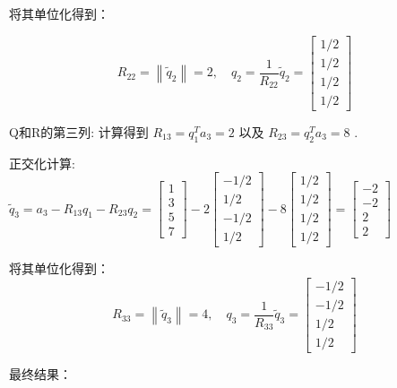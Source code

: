 \begin{example}
将其单位化得到：

$$
R_{22}=\left\|\tilde{q}_{2}\right\|=2, \quad q_{2}=\frac{1}{R_{22}} \tilde{q}_{2}=\left[\begin{array}{c}
1 / 2 \\
1 / 2 \\
1 / 2 \\
1 / 2
\end{array}\right]
$$

Q和R的第三列:
计算得到 $R_{13}=q_{1}^{T} a_{3}=2$ 以及 $R_{23}=q_{2}^{T} a_{3}=8$ .

正交化计算:
$\tilde{q}_{3}=a_{3}-R_{13} q_{1}-R_{23} q_{2}=\left[\begin{array}{l}1 \\ 3 \\ 5 \\ 7\end{array}\right]-2\left[\begin{array}{r}-1 / 2 \\ 1 / 2 \\ -1 / 2 \\ 1 / 2\end{array}\right]-8\left[\begin{array}{l}1 / 2 \\ 1 / 2 \\ 1 / 2 \\ 1 / 2\end{array}\right]=\left[\begin{array}{r}-2 \\ -2 \\ 2 \\ 2\end{array}\right]$

将其单位化得到：
$$
R_{33}=\left\|\tilde{q}_{3}\right\|=4, \quad q_{3}=\frac{1}{R_{33}} \tilde{q}_{3}=\left[\begin{array}{c}
-1 / 2 \\
-1 / 2 \\
1 / 2 \\
1 / 2
\end{array}\right]
$$

最终结果：


\end{example}
